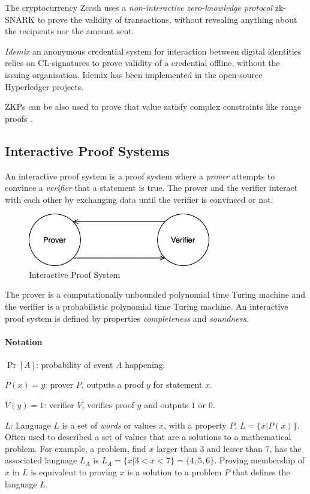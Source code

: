 The cryptocurrency Zcash uses a \textit{non-interactive zero-knowledge protocol} zk-SNARK \cite{bowe2018multi} to prove the validity of transactions, without revealing anything about the recipients nor the amount sent.

\textit{Idemix} \cite{camenisch2002design} an anonymous credential system for interaction between digital identities relies on CL-signatures \cite{camenisch2001efficient} to prove validity of a credential offline, without the issuing organisation.
Idemix has been implemented in the open-source Hyperledger projects.

ZKPs can be also used to prove that value satisfy complex constraints like range proofs \cite{camenisch2008efficient}.

\newpage
\subsection{Interactive Proof Systems}
\label{section:interactive-proof-systems}
An interactive proof system is a proof system where a \textit{prover} attempts to convince a \textit{verifier} that a statement is true.
The prover and the verifier interact with each other by exchanging data until the verifier is convinced or not.

\begin{figure}[h]
	\centering
	\includegraphics[width=8cm]{images/interactive-proof-system}
	\caption{Interactive Proof System}
	\label{fig:interactive-proof-system}
\end{figure}

The prover is a computationally unbounded polynomial time Turing machine and the verifier is a probabilistic polynomial time Turing machine.
An interactive proof system is defined by properties \textit{completeness} and \textit{soundness}.

\paragraph{Notation}
\begin{description}
	\item $\Pr[A]$: probability of event $A$ happening.
	\item $P(x) = y$: prover $P$, outputs a proof $y$ for statement $x$.
	\item $V(y) = 1$: verifier $V$, verifies proof $y$ and outputs $1$ or $0$.
	\item $L$: Language $L$ is a set of \textit{words} or values $x$, with a property $P$, $L = \{x | P(x)\}$. Often used to described a set of values that are a solutions to a mathematical problem. For example, a problem, find $x$ larger than $3$ and lesser than $7$, has the associated language $L_A$ is $L_A = \{x| 3<x<7\} = \{4,5,6\}$. Proving membership of $x$ in $L$ is equivalent to proving $x$ is a solution to a problem $P$ that defines the language $L$.
\end{description}


